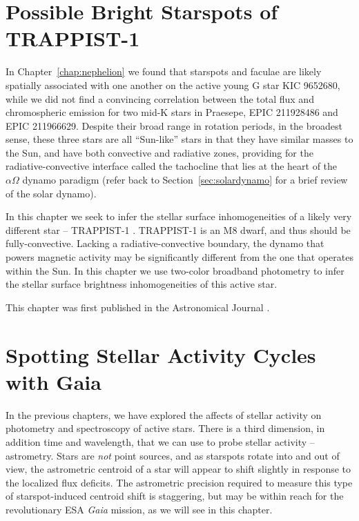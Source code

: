 \documentclass[12pt, twoside]{uwthesis}
\newcommand{\gaia}{\textit{Gaia}\xspace}
\begin{document}
\chapter{Possible Bright Starspots of TRAPPIST-1} \label{chap:trappist1_bright}

In Chapter~\ref{chap:nephelion} we found that starspots and faculae are likely spatially associated with one another on the active young G star KIC 9652680, while we did not find a convincing correlation between the total flux and chromospheric emission for two mid-K stars in Praesepe, EPIC 211928486 and EPIC 211966629. Despite their broad range in rotation periods, in the broadest sense, these three stars are all ``Sun-like'' stars in that they have similar masses to the Sun, and have both convective and radiative zones, providing for the radiative-convective interface called the tachocline that lies at the heart of the $\alpha\Omega$ dynamo paradigm (refer back to Section~\ref{sec:solardynamo} for a brief review of the solar dynamo). 

In this chapter we seek to infer the stellar surface inhomogeneities of a likely very different star -- TRAPPIST-1 \citep{Gillon2016,Gillon2017}. TRAPPIST-1 is an M8 dwarf, and thus should be fully-convective. Lacking a radiative-convective boundary, the dynamo that powers magnetic activity may be significantly different from the one that operates within the Sun. In this chapter we use two-color broadband photometry to infer the stellar surface brightness inhomogeneities of this active star. 

This chapter was first published in the Astronomical Journal \citep{Morris2018c}.



\chapter{Spotting Stellar Activity Cycles with Gaia} \label{chap:gaia}

In the previous chapters, we have explored the affects of stellar activity on photometry and spectroscopy of active stars. There is a third dimension, in addition time and wavelength, that we can use to probe stellar activity -- astrometry. Stars are \textit{not} point sources, and as starspots rotate into and out of view, the astrometric centroid of a star will appear to shift slightly in response to the localized flux deficits. The astrometric precision required to measure this type of starspot-induced centroid shift is staggering, but may be within reach for the revolutionary ESA \gaia mission, as we will see in this chapter.
\end{document}
